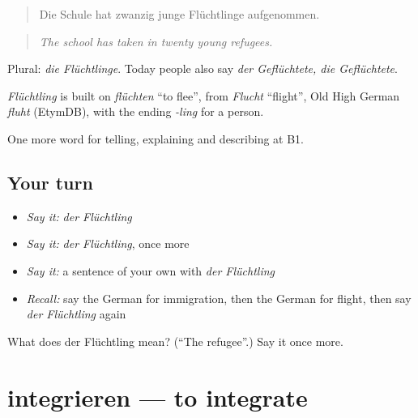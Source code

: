 \begin{quote}
Die Schule hat zwanzig junge Flüchtlinge aufgenommen.
\end{quote}

\begin{quote}
\emph{The school has taken in twenty young refugees.}
\end{quote}

Plural: \emph{die Flüchtlinge}. Today people also say \emph{der Geflüchtete, die Geflüchtete}.

\begin{cousinweb}
\emph{Flüchtling} is built on \emph{flüchten} \textquotedblleft{}to flee\textquotedblright{}, from \emph{Flucht} \textquotedblleft{}flight\textquotedblright{}, Old High German \emph{fluht} (EtymDB), with the ending \emph{-ling} for a person.
\end{cousinweb}

\begin{grammarlens}[title={What you've built}]
One more word for telling, explaining and describing at B1.
\end{grammarlens}

\subsection*{Your turn}
\begin{itemize}
\raggedright
  \item \emph{Say it:} \emph{der Flüchtling}
  \item \emph{Say it:} \emph{der Flüchtling}, once more
  \item \emph{Say it:} a sentence of your own with \emph{der Flüchtling}
  \item \emph{Recall:} say the German for immigration, then the German for flight, then say \emph{der Flüchtling} again
\end{itemize}

\begin{tcolorbox}[breakable,colback=teal!4,colframe=teal!35!black,title={Before you move on}]
What does der Flüchtling mean? (\textquotedblleft{}The refugee\textquotedblright{}.) Say it once more.
\end{tcolorbox}
\section[integrieren]{integrieren — to integrate}

\label{lesson:GE-C361-integrieren}



